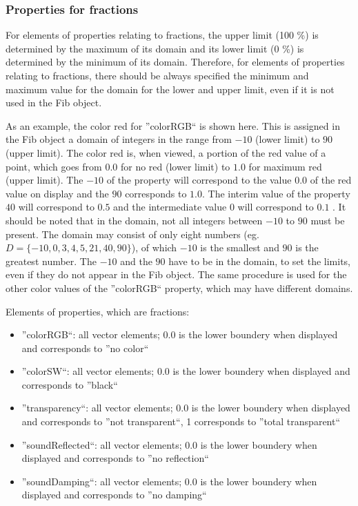 \subsubsection{Properties for fractions}

For elements of properties relating to fractions, the upper limit (100 \%) is determined by the maximum of its domain and its lower limit (0 \%) is determined by the minimum of its domain. Therefore, for elements of properties relating to fractions, there should be always specified the minimum and maximum value for the domain for the lower and upper limit, even if it is not used in the Fib object.

As an example, the color red for ''colorRGB`` is shown here. This is assigned in the Fib object a domain of integers in the range from $-10$ (lower limit) to $90$ (upper limit). The color red is, when viewed, a portion of the red value of a point, which goes from $0.0$ for no red (lower limit) to $1.0$ for maximum red (upper limit). The $-10$ of the property will correspond to the value $0.0$ of the red value on display and the $90$ corresponds to $1.0$. The interim value of the property $40$ will correspond to $0.5$ and the intermediate value $0$ will correspond to $0.1$ . It should be noted that in the domain, not all integers between $-10$ to $90$ must be present. The domain may consist of only eight numbers (eg. $D=\{-10, 0, 3, 4, 5, 21, 40, 90\}$), of which $-10$ is the smallest and $90$ is the greatest number. The $-10$ and the $90$ have to be in the domain, to set the limits, even if they do not appear in the Fib object.
The same procedure is used for the other color values of the ''colorRGB`` property, which may have different domains.

\bigskip\noindent
Elements of properties, which are fractions:
\begin{itemize}
 \item ''colorRGB``: all vector elements; 0.0 is the lower boundery when displayed and corresponds to ''no color``
 \item ''colorSW``: all vector elements; 0.0 is the lower boundery when displayed and corresponds to ''black``
 \item ''transparency``: all vector elements; 0.0 is the lower boundery when displayed and corresponds to ''not transparent``, 1 corresponds to ''total transparent``
 \item ''soundReflected``: all vector elements; 0.0 is the lower boundery when displayed and corresponds to ''no reflection``
 \item ''soundDamping``: all vector elements; 0.0 is the lower boundery when displayed and corresponds to ''no damping``
\end{itemize}

